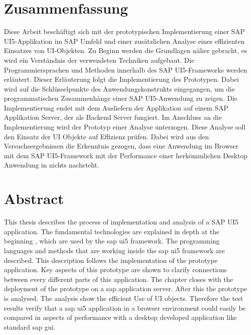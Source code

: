 \section*{Zusammenfassung}
Diese Arbeit beschäftigt sich mit der prototypischen Implementierung einer SAP UI5-Applikation im SAP Umfeld und einer zusätzlichen Analyse eines effizienten Einsatzes von UI-Objekten. Zu Beginn werden die Grundlagen näher gebracht, es wird ein Verständnis der verwendeten Techniken aufgebaut. Die Programmiersprachen und Methoden innerhalb des SAP UI5-Frameworks werden erläutert. Dieser Erläuterung folgt die Implementierung des Prototypen. Dabei wird auf die Schlüsselpunkte des Anwendungskonstrukts eingegangen, um die programmatischen Zusammenhänge einer SAP UI5-Anwendung zu zeigen. Die Implementierung endet mit dem Ausliefern der Applikation auf einem SAP Applikation Server, der als Backend Server fungiert. Im Anschluss an die Implementierung wird der Prototyp einer Analyse unterzogen. Diese Analyse soll den Einsatz der UI Objekte auf Effizienz prüfen. Dabei wird aus den Versuchsergebnissen die Erkenntnis gezogen, dass eine Anwendung im Browser mit dem SAP UI5-Framework mit der Performance einer herkömmlichen Desktop Anwendung in nichts nachsteht.


%


\section*{Abstract}
This thesis describes the process of implementation and analysis of a SAP UI5 application. The fundamental technologies are explained in depth at the beginning , which are used by the sap ui5 framework. The programming languages and methods that are working inside the sap ui5 framework are described. This description follows the implementation of the prototype application. Key aspects of this prototype are shown to clarify connections between every different parts of this application. The chapter closes with the deployment of the prototype on a sap application server. After this the prototype is analysed. The analysis show the efficient Use of UI objects. Therefore the test results verify that a sap ui5 application in a browser environment could easily be compared in aspects of performance with a desktop developed application like standard sap gui.